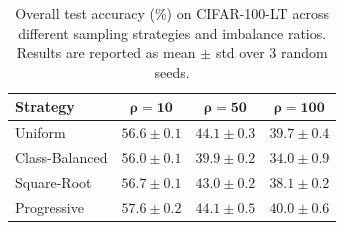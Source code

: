 \begin{table}[htbp]
\centering
\caption{Overall test accuracy (\%) on CIFAR-100-LT across different sampling strategies and imbalance ratios. Results are reported as mean $\pm$ std over 3 random seeds.}
\label{tab:overall_results}
\begin{tabular}{lccc}
\toprule
\textbf{Strategy} & $\boldsymbol{\rho = 10}$ & $\boldsymbol{\rho = 50}$ & $\boldsymbol{\rho = 100}$ \\
\midrule
Uniform & $56.6 \pm 0.1$ & $44.1 \pm 0.3$ & $39.7 \pm 0.4$ \\
Class-Balanced & $56.0 \pm 0.1$ & $39.9 \pm 0.2$ & $34.0 \pm 0.9$ \\
Square-Root & $56.7 \pm 0.1$ & $43.0 \pm 0.2$ & $38.1 \pm 0.2$ \\
Progressive & $57.6 \pm 0.2$ & $44.1 \pm 0.5$ & $40.0 \pm 0.6$ \\
\bottomrule
\end{tabular}
\end{table}